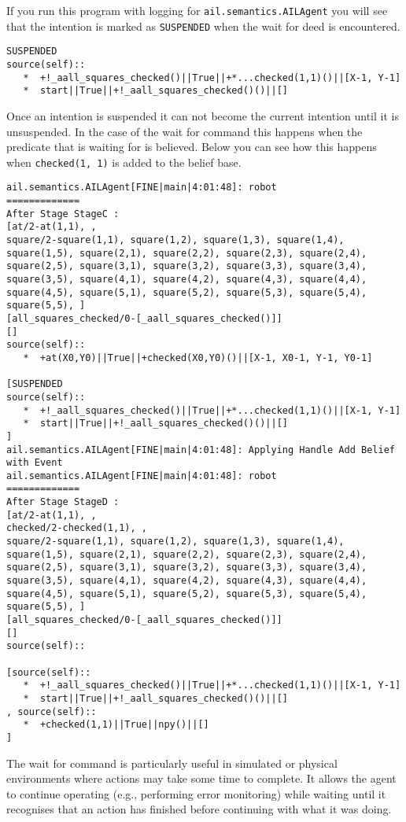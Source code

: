 If you run this program with logging for \texttt{ail.semantics.AILAgent} you will see that the intention is marked as \texttt{SUSPENDED} when the wait for deed is encountered.
\begin{verbatim}
SUSPENDED
source(self):: 
   *  +!_aall_squares_checked()||True||+*...checked(1,1)()||[X-1, Y-1]
   *  start||True||+!_aall_squares_checked()()||[]
\end{verbatim}
Once an intention is suspended it can not become the current intention until it is unsuspended.  In the case of the wait for command this happens when the predicate that is waiting for is believed.  Below you can see how this happens when \texttt{checked(1, 1)} is added to the belief base.

\begin{verbatim}
ail.semantics.AILAgent[FINE|main|4:01:48]: robot
=============
After Stage StageC :
[at/2-at(1,1), , 
square/2-square(1,1), square(1,2), square(1,3), square(1,4), square(1,5), square(2,1), square(2,2), square(2,3), square(2,4), square(2,5), square(3,1), square(3,2), square(3,3), square(3,4), square(3,5), square(4,1), square(4,2), square(4,3), square(4,4), square(4,5), square(5,1), square(5,2), square(5,3), square(5,4), square(5,5), ]
[all_squares_checked/0-[_aall_squares_checked()]]
[]
source(self):: 
   *  +at(X0,Y0)||True||+checked(X0,Y0)()||[X-1, X0-1, Y-1, Y0-1]

[SUSPENDED
source(self):: 
   *  +!_aall_squares_checked()||True||+*...checked(1,1)()||[X-1, Y-1]
   *  start||True||+!_aall_squares_checked()()||[]
] 
ail.semantics.AILAgent[FINE|main|4:01:48]: Applying Handle Add Belief with Event 
ail.semantics.AILAgent[FINE|main|4:01:48]: robot
=============
After Stage StageD :
[at/2-at(1,1), , 
checked/2-checked(1,1), , 
square/2-square(1,1), square(1,2), square(1,3), square(1,4), square(1,5), square(2,1), square(2,2), square(2,3), square(2,4), square(2,5), square(3,1), square(3,2), square(3,3), square(3,4), square(3,5), square(4,1), square(4,2), square(4,3), square(4,4), square(4,5), square(5,1), square(5,2), square(5,3), square(5,4), square(5,5), ]
[all_squares_checked/0-[_aall_squares_checked()]]
[]
source(self):: 

[source(self):: 
   *  +!_aall_squares_checked()||True||+*...checked(1,1)()||[X-1, Y-1]
   *  start||True||+!_aall_squares_checked()()||[]
, source(self):: 
   *  +checked(1,1)||True||npy()||[]
] 
\end{verbatim}

The wait for command is particularly useful in simulated or physical environments where actions may take some time to complete.  It allows the agent to continue operating (e.g., performing error monitoring) while waiting until it recognises that an action has finished before continuing with what it was doing.


